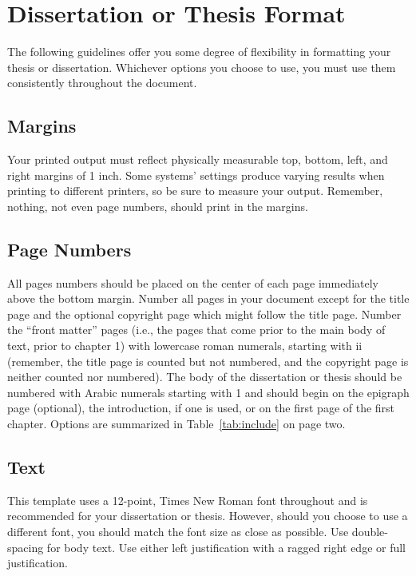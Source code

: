 \chapter{Dissertation or Thesis Format}
\label{ch:2}

The following guidelines offer you some degree of flexibility in formatting your thesis or dissertation.
Whichever options you choose to use, you must use them consistently throughout the document.

\section{Margins}

Your printed output must reflect physically measurable top, bottom, left, and right margins of 1 inch.
Some systems' settings produce varying results when printing to different printers, so be sure to measure your output.
Remember, nothing, not even page numbers, should print in the margins.

\section{Page Numbers}

All pages numbers should be placed on the center of each page immediately above the bottom margin.
Number all pages in your document except for the title page and the optional copyright page which might follow the title page.
Number the ``front matter'' pages (i.e., the pages that come prior to the main body of text, prior to chapter 1) with lowercase roman numerals, starting with ii (remember, the title page is counted but not numbered, and the copyright page is neither counted nor numbered).
The body of the dissertation or thesis should be numbered with Arabic numerals starting with 1 and should begin on the epigraph page (optional), the introduction, if one is used, or on the first page of the first chapter.
Options are summarized in Table~\ref{tab:include} on page two.

\section{Text}

This template uses a 12-point, Times New Roman font throughout and is recommended for your dissertation or thesis.
However, should you choose to use a different font, you should match the font size as close as possible.
Use double-spacing for body text.
Use either left justification with a ragged right edge or full justification.

